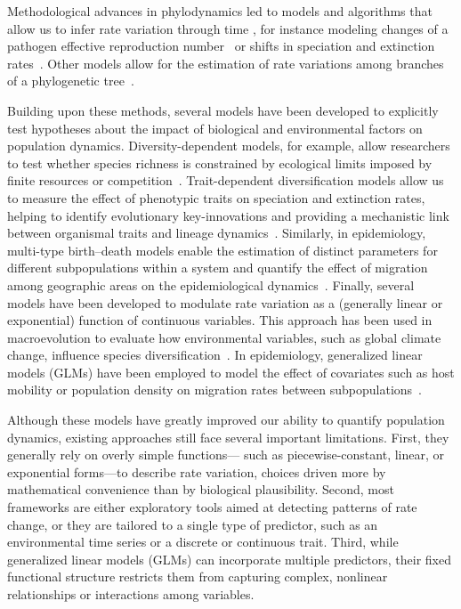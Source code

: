 Methodological advances in phylodynamics led to models and algorithms that allow us to infer rate variation through time \cite{stadler2013birth}, for instance modeling changes of a pathogen effective reproduction number~\cite{judge2024epifusion} or shifts in speciation and extinction rates~\cite{stadler2011mammalian, may2016bayesian}. 
Other models allow for the estimation of rate variations among branches of a phylogenetic tree~\cite{alfaro2009nine, rabosky2014automatic}.

Building upon these methods, several models have been developed to explicitly test hypotheses about the impact of biological and environmental factors on population dynamics.
Diversity-dependent models, for example, allow researchers to test whether species richness is constrained by ecological limits imposed by finite resources or competition~\cite{rosindell2015unifying, xu2018detecting}. 
Trait-dependent diversification models allow us to measure the effect of phenotypic traits on speciation and extinction rates, helping to identify evolutionary key-innovations and providing a mechanistic link between organismal traits and lineage dynamics~\cite{maddison2007estimating, fitzjohn2010quantitative, beaulieu2016detecting}. 
Similarly, in epidemiology, multi-type birth--death models enable the estimation of distinct parameters for different subpopulations within a system and quantify the effect of migration among geographic areas on the epidemiological dynamics~\cite{stadler2013uncovering, kuhnert2016phylodynamics, kovalenko2023phylodynamics}. 
Finally, several models have been developed to modulate rate variation as a (generally linear or exponential) function of continuous variables. 
This approach has been used in macroevolution to evaluate how environmental variables, such as global climate change, influence species diversification~\cite{condamine2013macroevolutionary, condamine2020rise}.
In epidemiology, generalized linear models (GLMs) have been employed to model the effect of covariates such as host mobility or population density on migration rates between subpopulations~\cite{lemey2014unifying, muller2019inferring, valenzuela2021comprehensive}.

Although these models have greatly improved our ability to quantify population dynamics, existing approaches still face several important limitations.
First, they generally rely on overly simple functions--- such as piecewise-constant, linear, or exponential forms---to describe rate variation, choices driven more by mathematical convenience than by biological plausibility.
Second, most frameworks are either exploratory tools aimed at detecting patterns of rate change, or they are tailored to a single type of predictor, such as an environmental time series or a discrete or continuous trait.
Third, while generalized linear models (GLMs) can incorporate multiple predictors, their fixed functional structure restricts them from capturing complex, nonlinear relationships or interactions among variables.

